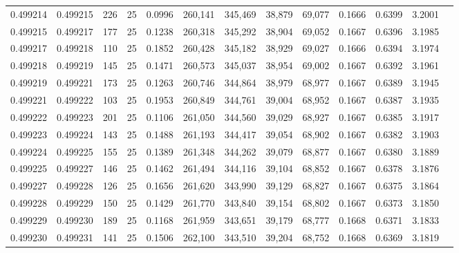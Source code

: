\begin{tabular}{rrrrrrrrrrrrr}
0.499214 & 0.499215 & 226 &  25 &                                     0.0996 & 260,141 & 345,469 &  38,879 &  69,077 & 0.1666 & 0.6399 & 3.2001 \\
0.499215 & 0.499217 & 177 &  25 &                                     0.1238 & 260,318 & 345,292 &  38,904 &  69,052 & 0.1667 & 0.6396 & 3.1985 \\
0.499217 & 0.499218 & 110 &  25 &                                     0.1852 & 260,428 & 345,182 &  38,929 &  69,027 & 0.1666 & 0.6394 & 3.1974 \\
0.499218 & 0.499219 & 145 &  25 &                                     0.1471 & 260,573 & 345,037 &  38,954 &  69,002 & 0.1667 & 0.6392 & 3.1961 \\
0.499219 & 0.499221 & 173 &  25 &                                     0.1263 & 260,746 & 344,864 &  38,979 &  68,977 & 0.1667 & 0.6389 & 3.1945 \\
0.499221 & 0.499222 & 103 &  25 &                                     0.1953 & 260,849 & 344,761 &  39,004 &  68,952 & 0.1667 & 0.6387 & 3.1935 \\
0.499222 & 0.499223 & 201 &  25 &                                     0.1106 & 261,050 & 344,560 &  39,029 &  68,927 & 0.1667 & 0.6385 & 3.1917 \\
0.499223 & 0.499224 & 143 &  25 &                                     0.1488 & 261,193 & 344,417 &  39,054 &  68,902 & 0.1667 & 0.6382 & 3.1903 \\
0.499224 & 0.499225 & 155 &  25 &                                     0.1389 & 261,348 & 344,262 &  39,079 &  68,877 & 0.1667 & 0.6380 & 3.1889 \\
0.499225 & 0.499227 & 146 &  25 &                                     0.1462 & 261,494 & 344,116 &  39,104 &  68,852 & 0.1667 & 0.6378 & 3.1876 \\
0.499227 & 0.499228 & 126 &  25 &                                     0.1656 & 261,620 & 343,990 &  39,129 &  68,827 & 0.1667 & 0.6375 & 3.1864 \\
0.499228 & 0.499229 & 150 &  25 &                                     0.1429 & 261,770 & 343,840 &  39,154 &  68,802 & 0.1667 & 0.6373 & 3.1850 \\
0.499229 & 0.499230 & 189 &  25 &                                     0.1168 & 261,959 & 343,651 &  39,179 &  68,777 & 0.1668 & 0.6371 & 3.1833 \\
0.499230 & 0.499231 & 141 &  25 &                                     0.1506 & 262,100 & 343,510 &  39,204 &  68,752 & 0.1668 & 0.6369 & 3.1819 \\

\end{tabular}
